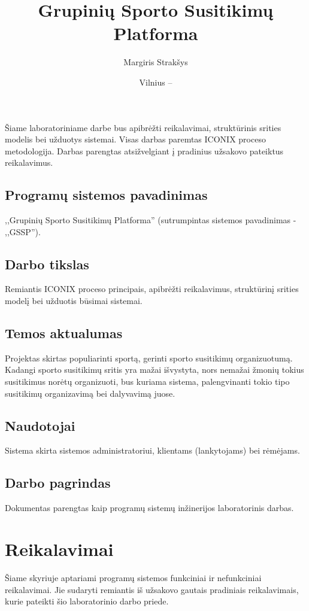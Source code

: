 \documentclass{VUMIFPSkursinis}
\title{Grupinių Sporto Susitikimų Platforma}
\author{Margiris Strakšys}
\date{Vilnius – \the\year}
\begin{document}
    \maketitle
    \tableofcontents
    
     \label{anotacija}
		Šiame laboratoriniame darbe bus apibrėžti reikalavimai, struktūrinis srities modelis bei užduotys sistemai. Visas darbas paremtas ICONIX proceso metodologija.
		Darbas parengtas atsižvelgiant į pradinius užsakovo pateiktus reikalavimus.
     \label{ivadas}
        \subsection*{Programų sistemos pavadinimas} \label{ivadas_psPavadinimas}
            ,,Grupinių Sporto Susitikimų Platforma'' (sutrumpintas sistemos pavadinimas - ,,GSSP'').
        \subsection*{Darbo tikslas} \label{ivadas_darboTikslas}
            Remiantis ICONIX proceso principais, apibrėžti reikalavimus, struktūrinį srities modelį bei užduotis būsimai sistemai.
        \subsection*{Temos aktualumas} \label{ivadas_aktualumas}
            Projektas skirtas populiarinti sportą, gerinti sporto susitikimų organizuotumą. Kadangi sporto susitikimų sritis yra mažai 
            išvystyta, nors nemažai žmonių tokius susitikimus norėtų organizuoti, bus kuriama sistema, palengvinanti tokio tipo susitikimų 
            organizavimą bei dalyvavimą juose.
        \subsection*{Naudotojai} \label{ivadas_naudotojai}
            Sistema skirta sistemos administratoriui, klientams (lankytojams) bei rėmėjams.
        \subsection*{Darbo pagrindas} \label{ivadas_pagrindas}
            Dokumentas parengtas kaip programų sistemų inžinerijos laboratorinis darbas.
    \section{Reikalavimai} \label{reikalavimai}
		Šiame skyriuje aptariami programų sistemos funkciniai ir nefunkciniai reikalavimai. Jie sudaryti remiantis iš užsakovo gautais pradiniais
		reikalavimais, kurie pateikti šio laboratorinio darbo priede.
\end{document}
